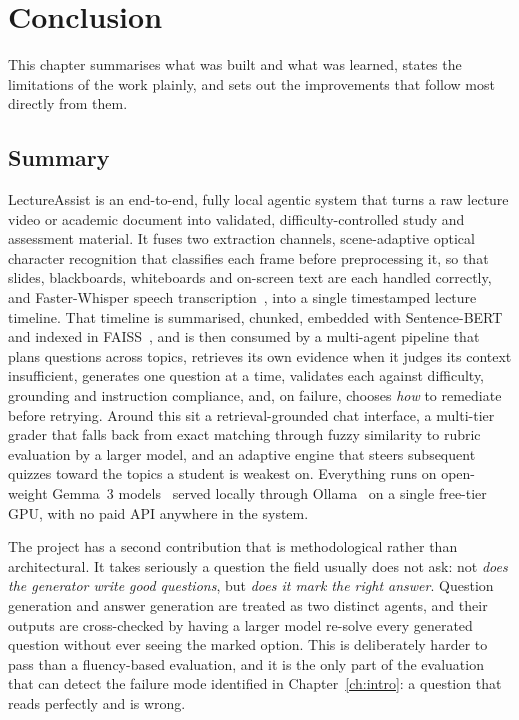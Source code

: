 \chapter{Conclusion}
\label{ch:conclusion}

This chapter summarises what was built and what was learned, states the limitations
of the work plainly, and sets out the improvements that follow most directly from
them.

\section{Summary}
\label{sec:concl-summary}

LectureAssist is an end-to-end, fully local agentic system that turns a raw
lecture video or academic document into validated, difficulty-controlled study
and assessment material. It fuses two extraction channels, scene-adaptive
optical character recognition that classifies each frame before preprocessing
it, so that slides, blackboards, whiteboards and on-screen text are each
handled correctly, and Faster-Whisper speech
transcription~\cite{radford2023whisper}, into a single timestamped lecture
timeline. That timeline is summarised, chunked, embedded with
Sentence-BERT~\cite{reimers2019sbert} and indexed in
FAISS~\cite{johnson2019faiss}, and is then consumed by a multi-agent pipeline
that plans questions across topics, retrieves its own evidence when it judges
its context insufficient, generates one question at a time, validates each
against difficulty, grounding and instruction compliance, and, on failure,
chooses \emph{how} to remediate before retrying. Around this sit a
retrieval-grounded chat interface, a multi-tier grader that falls back from
exact matching through fuzzy similarity to rubric evaluation by a larger
model, and an adaptive engine that steers subsequent quizzes toward the topics
a student is weakest on. Everything runs on open-weight Gemma~3
models~\cite{gemma3_2025} served locally through Ollama~\cite{ollama} on a
single free-tier GPU, with no paid API anywhere in the system.

The project has a second contribution that is methodological rather than
architectural. It takes seriously a question the field usually does not ask: not
\emph{does the generator write good questions}, but \emph{does it mark the right
answer}. Question generation and answer generation are treated as two distinct
agents, and their outputs are cross-checked by having a larger model re-solve every
generated question without ever seeing the marked option. This is deliberately
harder to pass than a fluency-based evaluation, and it is the only part of the
evaluation that can detect the failure mode identified in
Chapter~\ref{ch:intro}: a question that reads perfectly and is wrong.

